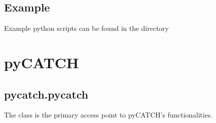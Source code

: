 \documentclass[letterpaper,10pt,english]{sphinxmanual}
\begin{document}
\begin{sphinxVerbatim}[commandchars=\\\{\}]
  
\end{sphinxVerbatim}


\section{Example}
\label{\detokenize{getting_started:example}}
\sphinxAtStartPar
Example python scripts can be found in the directory

\begin{sphinxVerbatim}[commandchars=\\\{\}]
\end{sphinxVerbatim}

\sphinxstepscope


\chapter{pyCATCH}
\label{\detokenize{pycatch/index:pycatch}}\label{\detokenize{pycatch/index::doc}}
\sphinxstepscope


\section{pycatch.pycatch}
\label{\detokenize{pycatch/pycatch:pycatch-pycatch}}\label{\detokenize{pycatch/pycatch::doc}}
\sphinxAtStartPar
The  class is the primary access point to pyCATCH’s functionalities.
\end{document}

